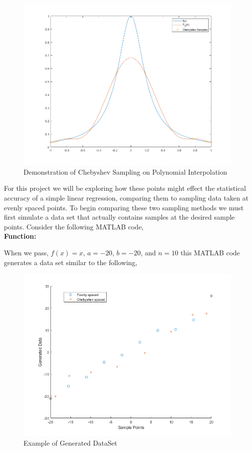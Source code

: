 \documentclass[12pt]{article}
\theoremstyle{homework}
\begin{document}
 \begin{figure}[H]
  \caption{Demonstration of Chebyshev Sampling on Polynomial Interpolation}
  \includegraphics[width = \textwidth]{Chebyexample.png}  
  \centering
\end{figure}



 For this project we will be exploring how these points might effect the statistical accuracy of a simple linear regression, comparing them to 
 sampling data taken at evenly spaced points. To begin comparing these two sampling methods we must first simulate a data set that actually contains samples at 
 the desired sample points. Consider the following MATLAB code,  \\
 \textbf{Function:}
 \begin{center}
 
 \end{center}
 When we pass, $f(x) = x$, $a = -20$, $b = -20$, and $n = 10$ this MATLAB code generates a data set similar to the following, 
 \begin{figure}[H]
  \caption{Example of Generated DataSet}
  \includegraphics[width = \textwidth]{Example_generated_data.png}  
  \centering
\end{figure}
\end{document}
